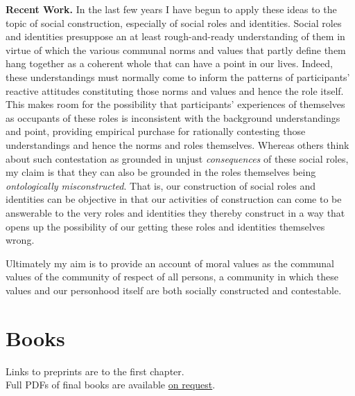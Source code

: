 \documentclass[%
  11pt,%
]{article}
\makeatletter
\newcommand{\onrequest}{\href{mailto:bennett.helm@fandm.edu}{on request}}
\makeatother
\begin{document}
\noindent\textbf{Recent Work.} In the last few years I have begun to apply these ideas to the topic of social construction, especially of social roles and identities. Social roles and identities presuppose an at least rough-and-ready understanding of them in virtue of which the various communal norms and values that partly define them hang together as a coherent whole that can have a point in our lives. Indeed, these understandings must normally come to inform the patterns of participants' reactive attitudes constituting those norms and values and hence the role itself. This makes room for the possibility that participants' experiences of themselves as occupants of these roles is inconsistent with the background understandings and point, providing empirical purchase for rationally contesting those understandings and hence the norms and roles themselves. Whereas others think about such contestation as grounded in unjust \emph{consequences} of these social roles, my claim is that they can also be grounded in the roles themselves being \emph{ontologically misconstructed}. That is, our construction of social roles and identities can be objective in that our activities of construction can come to be answerable to the very roles and identities they thereby construct in a way that opens up the possibility of our getting these roles and identities themselves wrong.

\bigskip{}

Ultimately my aim is to provide an account of moral values as the communal values of the community of respect of all persons, a community in which these values and our personhood itself are both socially constructed and contestable.


\section{Books}

\begin{center}
  Links to preprints are to the first chapter.\\
  Full PDFs of final books are available \onrequest{}.\\
  ~
\end{center}
\end{document}
